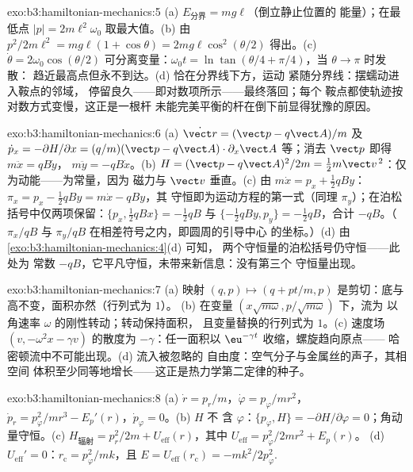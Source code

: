 \begin{solution}{exo:b3:hamiltonian-mechanics:5}
(a) $E_{\text{分界}} = mg\ell$（倒立静止位置的
能量）；在最低点 $|p| = 2m\ell^2\omega_0$ 取最大值。(b) 由
$p^2/2m\ell^2 = mg\ell(1 + \cos\theta) = 2mg\ell\cos^2(\theta/2)$ 得出。(c)
$\dot\theta = 2\omega_0\cos(\theta/2)$ 可分离变量：$\omega_0t =
\ln\tan(\theta/4 + \pi/4)$，当 $\theta \to \pi$ 时发散：
趋近最高点但永不到达。(d) 恰在分界线下方，运动
紧随分界线：摆蠕动进入鞍点的邻域，
停留良久——即对数项所示——最终落回；每个
鞍点都使轨迹按对数方式变慢，这正是一根杆
未能完美平衡的杆在倒下前显得犹豫的原因。
\end{solution}

\begin{solution}{exo:b3:hamiltonian-mechanics:6}
(a) $\dot{\vect r} = (\vect p - q\vect A)/m$ 及 $\dot p_x =
-\partial H/\partial x = (q/m)(\vect p - q\vect A)\cdot\partial_x\vect
A$ 等；消去 $\vect p$ 即得 $m\ddot x = qB\dot y$，
$m\ddot y = -qB\dot x$。(b) $H = (\vect p - q\vect A)^2/2m = \tfrac12
m\vect v^{\,2}$：仅为动能——为常量，因为
磁力与 $\vect v$ 垂直。(c) 由 $m\dot x = p_x +
\tfrac12 qBy$：$\pi_x = p_x - \tfrac12 qBy = m\dot x - qBy$，其
守恒即为运动方程的第一式（同理 $\pi_y$）；在泊松
括号中仅两项保留：$\{p_x, \tfrac12 qBx\} = -\tfrac12
qB$ 与 $\{-\tfrac12 qBy, p_y\} = -\tfrac12 qB$，合计 $-qB$。（$\pi_x/qB$ 与 $\pi_y/qB$
在相差符号之内，即圆周的引导中心
的坐标。）(d) 由 \cref{exo:b3:hamiltonian-mechanics:4}(d) 可知，
两个守恒量的泊松括号仍守恒——此处为
常数 $-qB$，它平凡守恒，未带来新信息：没有第三个
守恒量出现。
\end{solution}

\begin{solution}{exo:b3:hamiltonian-mechanics:7}
(a) 映射 $(q, p) \mapsto (q + pt/m, p)$ 是剪切：底与
高不变，面积亦然（行列式为 $1$）。
(b) 在变量 $(x\sqrt{m\omega}, p/\sqrt{m\omega})$ 下，流为
以角速率 $\omega$ 的刚性转动；转动保持面积，
且变量替换的行列式为 $1$。(c) 速度场
$(v, -\omega^2x - \gamma v)$ 的散度为 $-\gamma$：任一面积以
$\eu^{-\gamma t}$ 收缩，螺旋趋向原点——
哈密顿流中不可能出现。(d) 流入被忽略的
自由度：空气分子与金属丝的声子，其相空间
体积至少同等地增长——这正是热力学第二定律的种子。
\end{solution}

\begin{solution}{exo:b3:hamiltonian-mechanics:8}
(a) $\dot r = p_r/m$，$\dot\varphi = p_\varphi/mr^2$，$\dot p_r =
p_\varphi^2/mr^3 - E_p'(r)$，$\dot p_\varphi = 0$。(b) $H$ 不
含 $\varphi$：$\{p_\varphi, H\} = -\partial H/\partial\varphi =
0$；角动量守恒。(c) $H_{\text{辐射}} = p_r^2/2m +
U_{\text{eff}}(r)$，其中 $U_{\text{eff}} = p_\varphi^2/2mr^2 + E_p(r)$。
(d) $U_{\text{eff}}' = 0$：$r_{\text{c}} = p_\varphi^2/mk$，且 $E =
U_{\text{eff}}(r_{\text{c}}) = -mk^2/2p_\varphi^2$.
\end{solution}

